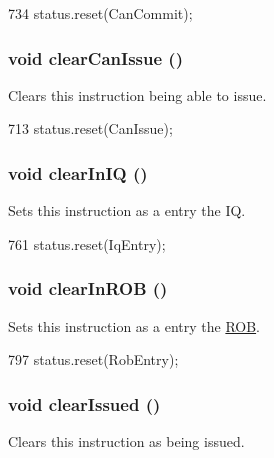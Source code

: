 \begin{DoxyCode}
734 { status.reset(CanCommit); }
\end{DoxyCode}
\hypertarget{classBaseDynInst_aad2d885accd9c810610076b4837a1d49}{
\subsubsection[{clearCanIssue}]{\setlength{\rightskip}{0pt plus 5cm}void clearCanIssue ()}}
\label{classBaseDynInst_aad2d885accd9c810610076b4837a1d49}
Clears this instruction being able to issue. 


\begin{DoxyCode}
713 { status.reset(CanIssue); }
\end{DoxyCode}
\hypertarget{classBaseDynInst_a0a7b38cc3c0a8ae3147bfbf3e29838ee}{
\subsubsection[{clearInIQ}]{\setlength{\rightskip}{0pt plus 5cm}void clearInIQ ()}}
\label{classBaseDynInst_a0a7b38cc3c0a8ae3147bfbf3e29838ee}
Sets this instruction as a entry the IQ. 


\begin{DoxyCode}
761 { status.reset(IqEntry); }
\end{DoxyCode}
\hypertarget{classBaseDynInst_a41c8d6d7d42f2e72d1ffc2f1e731cae3}{
\subsubsection[{clearInROB}]{\setlength{\rightskip}{0pt plus 5cm}void clearInROB ()}}
\label{classBaseDynInst_a41c8d6d7d42f2e72d1ffc2f1e731cae3}
Sets this instruction as a entry the \hyperlink{classROB}{ROB}. 


\begin{DoxyCode}
797 { status.reset(RobEntry); }
\end{DoxyCode}
\hypertarget{classBaseDynInst_ae6e7d08fe9e92022d54514af18b5b36a}{
\subsubsection[{clearIssued}]{\setlength{\rightskip}{0pt plus 5cm}void clearIssued ()}}
\label{classBaseDynInst_ae6e7d08fe9e92022d54514af18b5b36a}
Clears this instruction as being issued. 


